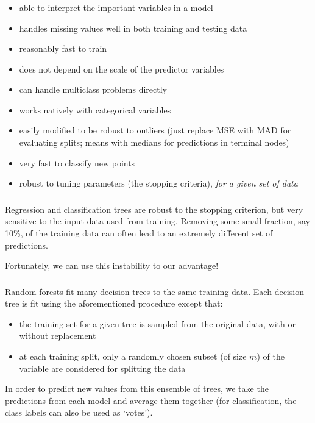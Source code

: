 \documentclass[xetex,mathserif,serif,aspectratio=169]{beamer}
\begin{document}
\begin{frame}[fragile] \frametitle{} \oldB \small

\textbf{}

\begin{itemize}
\item able to interpret the important variables in a model
\item handles missing values well in both training and testing data
\item reasonably fast to train
\item does not depend on the scale of the predictor variables
\item can handle multiclass problems directly
\item works natively with categorical variables
\item easily modified to be robust to outliers (just replace MSE with MAD
for evaluating splits; means with medians for predictions in terminal nodes)
\item very fast to classify new points
\item robust to tuning parameters (the stopping criteria), \textit{for a given set of data}
\end{itemize}

\end{frame}

\begin{frame}[fragile] \frametitle{} \oldB \small

\textbf{}

Regression and classification trees are robust to the stopping criterion,
but very sensitive to the input data used from training. Removing some
small fraction, say 10\%, of the training data can often lead to an
extremely different set of predictions.

Fortunately, we can use this instability to our advantage!

\end{frame}

\begin{frame}[fragile] \frametitle{} \oldB \small

\textbf{}

Random forests fit many decision trees to the same training data.
Each decision tree is fit using the aforementioned procedure except
that:
\begin{itemize}
\item the training set for a given tree is sampled from the original
data, with or without replacement
\item at each training split, only a randomly chosen subset (of size $m$)
of the variable are considered for splitting the data
\end{itemize}
In order to predict new values from this ensemble of trees, we take the
predictions from each model and average them together (for classification,
the class labels can also be used as `votes').

\end{frame}
\end{document}
